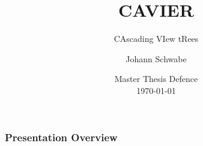 \documentclass[
	11pt, %
]{beamer}
\title[CAVIER]{CAVIER} %
\subtitle{CAscading VIew tRees} %
\author[Johann Schwabe]{Johann Schwabe} %
\institute[UZH]{University of Zurich\\ \smallskip \textit{johann.schwabe@uzh.ch}} %
\date[\today]{Master Thesis Defence \\ \today} %
\begin{document}

\begin{frame}
	\titlepage %
\end{frame}



\begin{frame}
	\frametitle{Presentation Overview} %
	
	\tableofcontents %
\end{frame}

\end{document}
